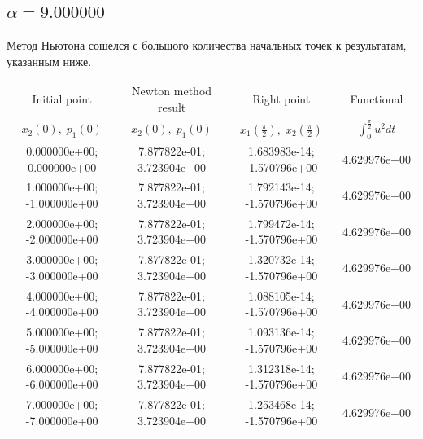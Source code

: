 \documentclass[titlepage]{article}
\def\l{\left}
\def\r{\right}
\begin{document}
\subsection{$\alpha = 9.000000$} 
Метод Ньютона сошелся с большого количества начальных точек к результатам, указанным ниже. \\ 
\begin{tabular}{ | c | c | c | c |} 
\hline 
Initial point  & Newton method result & Right point & Functional 
 \\ $x_2(0), \; p_1(0)$ & $x_2(0), \; p_1(0)$ & $x_1\l(\frac{\pi}{2}\r), \; x_2\l(\frac{\pi}{2}\r)$ & $\int_{0}^{\frac{\pi}{2}}u^2dt$  \\ \hline 
0.000000e+00; 0.000000e+00 & 7.877822e-01; 3.723904e+00 & 1.683983e-14; -1.570796e+00 & 4.629976e+00 \\ \hline 
1.000000e+00; -1.000000e+00 & 7.877822e-01; 3.723904e+00 & 1.792143e-14; -1.570796e+00 & 4.629976e+00 \\ \hline 
2.000000e+00; -2.000000e+00 & 7.877822e-01; 3.723904e+00 & 1.799472e-14; -1.570796e+00 & 4.629976e+00 \\ \hline 
3.000000e+00; -3.000000e+00 & 7.877822e-01; 3.723904e+00 & 1.320732e-14; -1.570796e+00 & 4.629976e+00 \\ \hline 
4.000000e+00; -4.000000e+00 & 7.877822e-01; 3.723904e+00 & 1.088105e-14; -1.570796e+00 & 4.629976e+00 \\ \hline 
5.000000e+00; -5.000000e+00 & 7.877822e-01; 3.723904e+00 & 1.093136e-14; -1.570796e+00 & 4.629976e+00 \\ \hline 
6.000000e+00; -6.000000e+00 & 7.877822e-01; 3.723904e+00 & 1.312318e-14; -1.570796e+00 & 4.629976e+00 \\ \hline 
7.000000e+00; -7.000000e+00 & 7.877822e-01; 3.723904e+00 & 1.253468e-14; -1.570796e+00 & 4.629976e+00 \\ \hline 
\end{tabular} 
\end{document}
